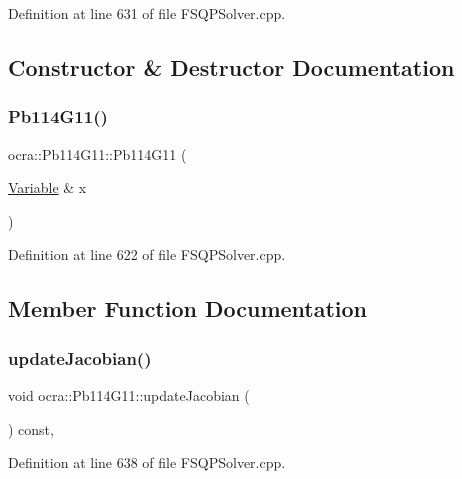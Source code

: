 Definition at line 631 of file F\+S\+Q\+P\+Solver.\+cpp.



\subsection{Constructor \& Destructor Documentation}
\hypertarget{classocra_1_1Pb114G11_a530be5f34e9ae31c8db6b1a62658dbe6}{}\label{classocra_1_1Pb114G11_a530be5f34e9ae31c8db6b1a62658dbe6} 
\subsubsection{\texorpdfstring{Pb114\+G11()}{Pb114G11()}}
{\footnotesize\ttfamily ocra\+::\+Pb114\+G11\+::\+Pb114\+G11 (\begin{DoxyParamCaption}\item[{\hyperlink{classocra_1_1Variable}{Variable} \&}]{x }\end{DoxyParamCaption})\hspace{0.3cm}{\ttfamily [inline]}}



Definition at line 622 of file F\+S\+Q\+P\+Solver.\+cpp.



\subsection{Member Function Documentation}
\hypertarget{classocra_1_1Pb114G11_a5dcd54dcc5ef337f78083f676d5d03bb}{}\label{classocra_1_1Pb114G11_a5dcd54dcc5ef337f78083f676d5d03bb} 
\subsubsection{\texorpdfstring{update\+Jacobian()}{updateJacobian()}}
{\footnotesize\ttfamily void ocra\+::\+Pb114\+G11\+::update\+Jacobian (\begin{DoxyParamCaption}{ }\end{DoxyParamCaption}) const\hspace{0.3cm}{\ttfamily [inline]}, {\ttfamily [protected]}}



Definition at line 638 of file F\+S\+Q\+P\+Solver.\+cpp.

